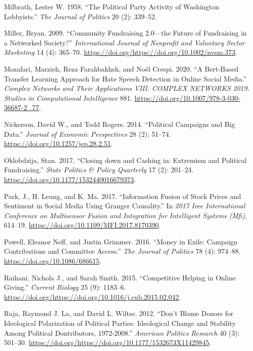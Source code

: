\documentclass[12pt,]{article}
\begin{document}
\leavevmode\hypertarget{ref-milbrath1958}{}%
Milbrath, Lester W. 1958. ``The Political Party Activity of Washington
Lobbyists.'' \emph{The Journal of Politics} 20 (2): 339--52.

\leavevmode\hypertarget{ref-miller2009}{}%
Miller, Bryan. 2009. ``Community Fundraising 2.0---the Future of
Fundraising in a Networked Society?'' \emph{International Journal of
Nonprofit and Voluntary Sector Marketing} 14 (4): 365--70.
\url{https://doi.org/https://doi.org/10.1002/nvsm.373}.

\leavevmode\hypertarget{ref-mozafari2020}{}%
Mozafari, Marzieh, Reza Farahbakhsh, and Noël Crespi. 2020. ``A
Bert-Based Transfer Learning Approach for Hate Speech Detection in
Online Social Media.'' \emph{Complex Networks and Their Applications
VIII. COMPLEX NETWORKS 2019. Studies in Computational Intelligence} 881.
\url{https://doi.org/10.1007/978-3-030-36687-2_77}.

\leavevmode\hypertarget{ref-nickerson2014}{}%
Nickerson, David W., and Todd Rogers. 2014. ``Political Campaigns and
Big Data.'' \emph{Journal of Economic Perspectives} 28 (2): 51--74.
\url{https://doi.org/10.1257/jep.28.2.51}.

\leavevmode\hypertarget{ref-oklobdzija2017}{}%
Oklobdzija, Stan. 2017. ``Closing down and Cashing in: Extremism and
Political Fundraising.'' \emph{State Politics \& Policy Quarterly} 17
(2): 201--24. \url{https://doi.org/10.1177/1532440016679373}.

\leavevmode\hypertarget{ref-park2017}{}%
Park, J., H. Leung, and K. Ma. 2017. ``Information Fusion of Stock
Prices and Sentiment in Social Media Using Granger Causality.'' In
\emph{2017 Ieee International Conference on Multisensor Fusion and
Integration for Intelligent Systems (Mfi)}, 614--19.
\url{https://doi.org/10.1109/MFI.2017.8170390}.

\leavevmode\hypertarget{ref-powell2016}{}%
Powell, Eleanor Neff, and Justin Grimmer. 2016. ``Money in Exile:
Campaign Contributions and Committee Access.'' \emph{The Journal of
Politics} 78 (4): 974--88. \url{https://doi.org/10.1086/686615}.

\leavevmode\hypertarget{ref-raihani2015}{}%
Raihani, Nichola J., and Sarah Smith. 2015. ``Competitive Helping in
Online Giving.'' \emph{Current Biology} 25 (9): 1183--6.
\url{https://doi.org/https://doi.org/10.1016/j.cub.2015.02.042}.

\leavevmode\hypertarget{ref-laraja2012}{}%
Raja, Raymond J. La, and David L. Wiltse. 2012. ``Don't Blame Donors for
Ideological Polarization of Political Parties: Ideological Change and
Stability Among Political Dontributors, 1972-2008.'' \emph{American
Politics Research} 40 (3): 501--30.
\url{https://doi.org/https://doi.org/10.1177/1532673X11429845}.
\end{document}
